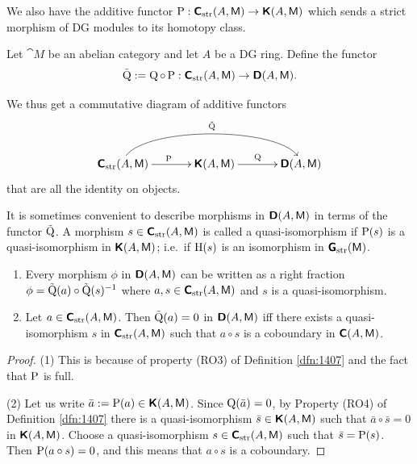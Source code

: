 We also have the additive functor
$\operatorname{P} : \boldsymbol{\mathsf{C}}_{\mathrm{str}}(A, \operatorname{\mathsf{M}}) \to \boldsymbol{\mathsf{K}}(A, \operatorname{\mathsf{M}})$
which sends a strict morphism of DG modules to its homotopy class.

\begin{dfn} \label{dfn:1480}
Let $\cat{M}$ be an abelian category and let $A$ be a DG ring.
Define the functor 
\[ \tilde{\operatorname{Q}} := \operatorname{Q} \circ \operatorname{P} : 
\boldsymbol{\mathsf{C}}_{\mathrm{str}}(A, \operatorname{\mathsf{M}}) \to \boldsymbol{\mathsf{D}}(A, \operatorname{\mathsf{M}}) . \]
\end{dfn}

We thus get a commutative diagram of additive functors
\begin{equation} \label{eqn:5025}
\UseTips \xymatrix @C=8ex @R=6ex {
\dcat{C}_{\mrm{str}}(A, \cat{M}) 
\ar[r]^{\opn{P}}
\ar@(u,u)[rr]^{\til{\opn{Q}}}
&
\dcat{K}(A, \cat{M})
\ar[r]^{\opn{Q}}
&
\dcat{D}(A, \cat{M})
}
\end{equation}
that are all the identity on objects.

It is sometimes convenient to describe morphisms in $\boldsymbol{\mathsf{D}}(A, \operatorname{\mathsf{M}})$
in terms of the functor $\tilde{\operatorname{Q}}$. A morphism 
$s \in \boldsymbol{\mathsf{C}}_{\mathrm{str}}(A, \operatorname{\mathsf{M}})$
is called a quasi-isomorphism if $\operatorname{P}(s)$ is a quasi-isomorphism
in $\boldsymbol{\mathsf{K}}(A, \operatorname{\mathsf{M}})$; i.e.\ if $\operatorname{H}(s)$ is an isomorphism in
$\boldsymbol{\mathsf{G}}_{\mathrm{str}}(\operatorname{\mathsf{M}})$. 

\begin{prop} \label{prop:1481}
\mbox{}
\begin{enumerate}
\item Every morphism $\phi$ in $\boldsymbol{\mathsf{D}}(A, \operatorname{\mathsf{M}})$ can be written as a right 
fraction 
$\phi = \tilde{\operatorname{Q}}(a) \circ \tilde{\operatorname{Q}}(s)^{-1}$
where $a, s \in \boldsymbol{\mathsf{C}}_{\mathrm{str}}(A, \operatorname{\mathsf{M}})$ and 
$s$ is a quasi-isomorphism. 

\item Let $a \in \boldsymbol{\mathsf{C}}_{\mathrm{str}}(A, \operatorname{\mathsf{M}})$. 
Then $\tilde{\operatorname{Q}}(a) = 0$ in $\boldsymbol{\mathsf{D}}(A, \operatorname{\mathsf{M}})$ iff 
there exists a quasi-isomorphism $s$ in $\boldsymbol{\mathsf{C}}_{\mathrm{str}}(A, \operatorname{\mathsf{M}})$
such that $a \circ s$ is a coboundary in $\boldsymbol{\mathsf{C}}(A, \operatorname{\mathsf{M}})$.
\end{enumerate}
\end{prop}

\begin{proof} \mbox{}

\smallskip \noindent
(1) This is because of property (RO3) of Definition \ref{dfn:1407} and the fact 
that $\operatorname{P}$ is full. 

\medskip \noindent 
(2) Let us write $\bar{a} := \operatorname{P}(a) \in \boldsymbol{\mathsf{K}}(A, \operatorname{\mathsf{M}})$.
Since $\operatorname{Q}(\bar{a}) = 0$, by Property (RO4) of Definition \ref{dfn:1407}
there is a quasi-isomorphism 
$\bar{s} \in \boldsymbol{\mathsf{K}}(A, \operatorname{\mathsf{M}})$
such that $\bar{a} \circ \bar{s} = 0$ in $\boldsymbol{\mathsf{K}}(A, \operatorname{\mathsf{M}})$.
Choose a quasi-isomorphism $s \in \boldsymbol{\mathsf{C}}_{\mathrm{str}}(A, \operatorname{\mathsf{M}})$
such that $\bar{s} = \operatorname{P}(s)$. Then $\operatorname{P}(a \circ s) = 0$, and 
this means that $a \circ s$ is a coboundary. 
\end{proof}

